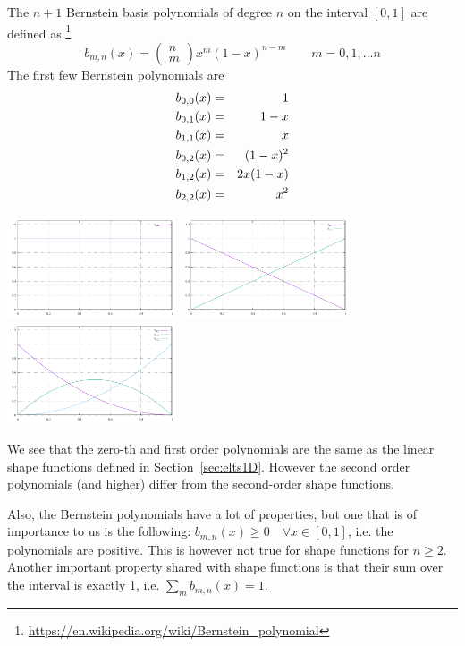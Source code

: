 


The $n+1$ Bernstein basis polynomials of degree $n$ on the interval $[0,1]$
are defined as \footnote{\url{https://en.wikipedia.org/wiki/Bernstein_polynomial}}
\[
b_{m,n}(x) = \left( \begin{array}{c} n \\ m \end{array}\right) x^m(1-x)^{n-m}
\qquad m=0,1,...n
\]
The first few Bernstein polynomials are 
\begin{eqnarray}
b_{0,0}(x) &=& 1 \\
b_{0,1}(x) &=& 1-x \nonumber\\
b_{1,1}(x) &=& x \\
b_{0,2}(x) &=& (1-x)^2 \nonumber\\
b_{1,2}(x) &=& 2x(1-x) \nonumber\\
b_{2,2}(x) &=& x^2 
\end{eqnarray}

\includegraphics[width=5cm]{images/bernstein/b0.pdf}
\includegraphics[width=5cm]{images/bernstein/b1.pdf}
\includegraphics[width=5cm]{images/bernstein/b2.pdf}

We see that the zero-th and first order polynomials are the same as the linear shape functions defined in 
Section~\ref{sec:elts1D}. However the second order polynomials (and higher) differ from the second-order
shape functions. 

Also, the Bernstein polynomials have a lot of properties, but one that is of importance to us
is the following: $b_{m,n}(x) \geq 0 \quad  \forall x\in [0,1]$, i.e. the polynomials 
are positive. This is however not true for shape functions for $n\geq 2$.
Another important property shared with shape functions is that their sum over the interval is 
exactly 1, i.e. $\sum_m b_{m,n}(x)=1$.

